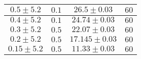 \documentclass[../main.tex]{subfiles}
\begin{document}
\begin{tabular}{ ||c|c|c|c|| }
        \hline
        $0.5\pm 5.2$      & $0.1$       & $26.5\pm 0.03$   & $60$     \\
        \hline
        $0.4\pm 5.2$      & $0.1$       & $24.74\pm 0.03$  & $60$     \\
        \hline
        $0.3\pm 5.2$      & $0.5$       & $22.07\pm 0.03$  & $60$     \\
        \hline
        $0.2\pm 5.2$      & $0.5$       & $17.145\pm 0.03$ & $60$     \\
        \hline
        $0.15\pm 5.2$     & $0.5$       & $11.33\pm 0.03$  & $60$     \\
        \hline

    \end{tabular}
\end{document}
